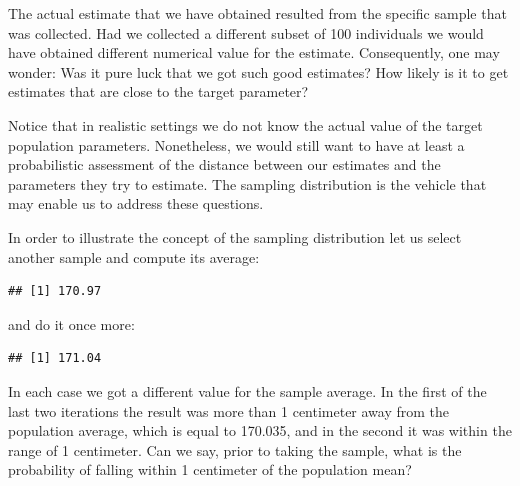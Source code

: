 \documentclass[]{krantz}
\makeatletter
\newenvironment{Shaded}{\begin{snugshade}}{\end{snugshade}}
\newcommand{\KeywordTok}[1]{\textcolor[rgb]{0.13,0.29,0.53}{\textbf{#1}}}
\newcommand{\DecValTok}[1]{\textcolor[rgb]{0.00,0.00,0.81}{#1}}
\newcommand{\StringTok}[1]{\textcolor[rgb]{0.31,0.60,0.02}{#1}}
\newcommand{\OperatorTok}[1]{\textcolor[rgb]{0.81,0.36,0.00}{\textbf{#1}}}
\newcommand{\NormalTok}[1]{#1}
\newenvironment{kframe}{%
\medskip{}
\setlength{\fboxsep}{.8em}
 \def\at@end@of@kframe{}%
 \ifinner\ifhmode%
  \def\at@end@of@kframe{\end{minipage}}%
  \begin{minipage}{\columnwidth}%
 \fi\fi%
 \def\FrameCommand##1{\hskip\@totalleftmargin \hskip-\fboxsep
 \colorbox{shadecolor}{##1}\hskip-\fboxsep
     \hskip-\linewidth \hskip-\@totalleftmargin \hskip\columnwidth}%
 \MakeFramed {\advance\hsize-\width
   \@totalleftmargin\z@ \linewidth\hsize
   \@setminipage}}%
 {\par\unskip\endMakeFramed%
 \at@end@of@kframe}
\renewenvironment{Shaded}{\begin{kframe}}{\end{kframe}}
\theoremstyle{definition}
\theoremstyle{definition}
\theoremstyle{definition}
\theoremstyle{remark}
\makeatother
\begin{document}
The actual estimate that we have obtained resulted from the specific
sample that was collected. Had we collected a different subset of 100
individuals we would have obtained different numerical value for the
estimate. Consequently, one may wonder: Was it pure luck that we got
such good estimates? How likely is it to get estimates that are close to
the target parameter?

Notice that in realistic settings we do not know the actual value of the
target population parameters. Nonetheless, we would still want to have
at least a probabilistic assessment of the distance between our
estimates and the parameters they try to estimate. The sampling
distribution is the vehicle that may enable us to address these
questions.

In order to illustrate the concept of the sampling distribution let us
select another sample and compute its average:

\begin{Shaded}
\end{Shaded}

\begin{verbatim}
## [1] 170.97
\end{verbatim}

and do it once more:

\begin{Shaded}
\end{Shaded}

\begin{verbatim}
## [1] 171.04
\end{verbatim}

In each case we got a different value for the sample average. In the
first of the last two iterations the result was more than 1 centimeter
away from the population average, which is equal to 170.035, and in the
second it was within the range of 1 centimeter. Can we say, prior to
taking the sample, what is the probability of falling within 1
centimeter of the population mean?
\end{document}
